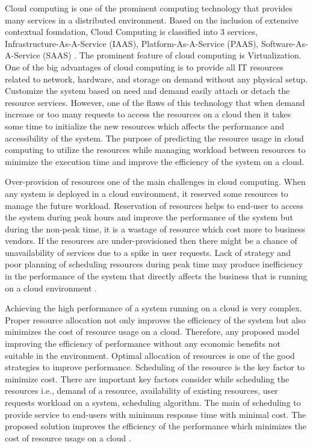  
Cloud computing is one of the prominent computing technology that provides many services in a distributed environment. Based on the inclusion of extensive contextual foundation, Cloud Computing is classified into 3 services, Infrastructure-As-A-Service (IAAS), Platform-As-A-Service (PAAS), Software-As-A-Service (SAAS) \cite{chen2011overview}. The prominent feature of cloud computing is Virtualization. One of the big advantages of cloud computing is to provide all IT resources related to network, hardware, and storage on demand without any physical setup. Customize the system based on need and demand easily attach or detach the resource services. However, one of the flaws of this technology that when demand increase or too many requests to access the resources on a cloud then it takes some time to initialize the new resources which affects the performance and accessibility of the system. The purpose of predicting the resource usage in cloud computing to utilize the resources while managing workload between resources to minimize the execution time and improve the efficiency of the system on a cloud.

Over-provision of resources one of the main challenges in cloud computing. When any system is deployed in a cloud environment, it reserved some resources to manage the future workload. Reservation of resources helps to end-user to access the system during peak hours and improve the performance of the system but during the non-peak time, it is a wastage of resource which cost more to business vendors. If the resources are under-provisioned then there might be a chance of unavailability of services due to a spike in user requests. Lack of strategy and poor planning of scheduling resources during peak time may produce inefficiency in the performance of the system that directly affects the business that is running on a cloud environment \cite{yadav2016priority}.

 Achieving the high performance of a system running on a cloud is very complex. Proper resource allocation not only improves the efficiency of the system but also minimizes the cost of resource usage on a cloud. Therefore, any proposed model improving the efficiency of performance without any economic benefits not suitable in the environment. Optimal allocation of resources is one of the good strategies to improve performance. Scheduling of the resource is the key factor to minimize cost. There are important key factors consider while scheduling the resources i.e., demand of a resource, availability of existing resources, user requests workload on a system, scheduling algorithm. The main of scheduling to provide service to end-users with minimum response time with minimal cost. The proposed solution improves the efficiency of the performance which minimizes the cost of resource usage on a cloud \cite{alam2017reliability}.
 
